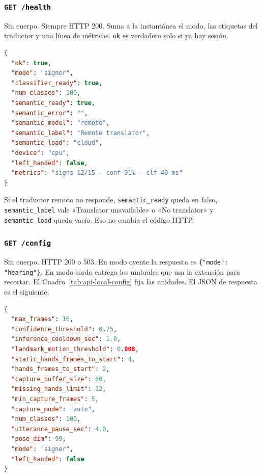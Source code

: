\subsubsection{\texttt{GET /health}}

Sin cuerpo. Siempre HTTP 200. Suma a la instantánea el modo, las etiquetas del traductor y una línea de métricas. \texttt{ok} es verdadero solo si ya hay sesión.

\begin{lstlisting}[language=json]
{
  "ok": true,
  "mode": "signer",
  "classifier_ready": true,
  "num_classes": 100,
  "semantic_ready": true,
  "semantic_error": "",
  "semantic_model": "remote",
  "semantic_label": "Remote translator",
  "semantic_load": "cloud",
  "device": "cpu",
  "left_handed": false,
  "metrics": "signs 12/15 - conf 91% - clf 40 ms"
}
\end{lstlisting}

Si el traductor remoto no responde, \texttt{semantic\_ready} queda en falso, \texttt{semantic\_label} vale «Translator unavailable» o «No translator» y \texttt{semantic\_load} queda vacío. Eso no cambia el código HTTP.

\subsubsection{\texttt{GET /config}}

Sin cuerpo. HTTP 200 o 503. En modo oyente la respuesta es \texttt{\{"mode": "hearing"\}}. En modo sordo entrega los umbrales que usa la extensión para recortar. El Cuadro~\ref{tab:api-local-config} fija las unidades. El JSON de respuesta es el siguiente.

\begin{lstlisting}[language=json]
{
  "max_frames": 16,
  "confidence_threshold": 0.75,
  "inference_cooldown_sec": 1.0,
  "landmark_motion_threshold": 0.008,
  "static_hands_frames_to_start": 4,
  "hands_frames_to_start": 2,
  "capture_buffer_size": 60,
  "missing_hands_limit": 12,
  "min_capture_frames": 5,
  "capture_mode": "auto",
  "num_classes": 100,
  "utterance_pause_sec": 4.0,
  "pose_dim": 99,
  "mode": "signer",
  "left_handed": false
}
\end{lstlisting}

